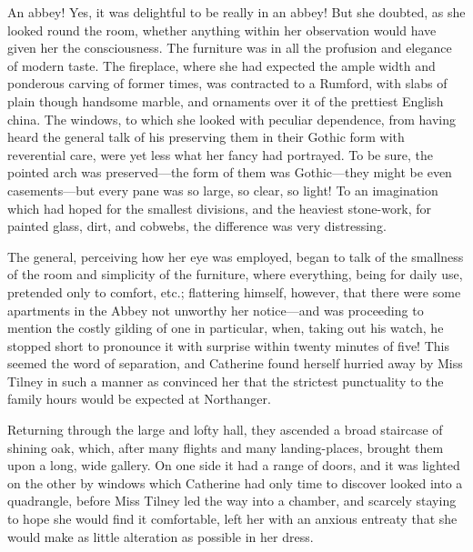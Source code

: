  An abbey! Yes, it was delightful to be really in an abbey! But she doubted, as she looked round the room, whether anything within her observation would have given her the consciousness. The furniture was in all the profusion and elegance of modern taste. The fireplace, where she had expected the ample width and ponderous carving of former times, was contracted to a Rumford, with slabs of plain though handsome marble, and ornaments over it of the prettiest English china. The windows, to which she looked with peculiar dependence, from having heard the general talk of his preserving them in their Gothic form with reverential care, were yet less what her fancy had portrayed. To be sure, the pointed arch was preserved—the form of them was Gothic—they might be even casements—but every pane was so large, so clear, so light! To an imagination which had hoped for the smallest divisions, and the heaviest stone-work, for painted glass, dirt, and cobwebs, the difference was very distressing. 

 The general, perceiving how her eye was employed, began to talk of the smallness of the room and simplicity of the furniture, where everything, being for daily use, pretended only to comfort, etc.; flattering himself, however, that there were some apartments in the Abbey not unworthy her notice—and was proceeding to mention the costly gilding of one in particular, when, taking out his watch, he stopped short to pronounce it with surprise within twenty minutes of five! This seemed the word of separation, and Catherine found herself hurried away by Miss Tilney in such a manner as convinced her that the strictest punctuality to the family hours would be expected at Northanger. 

 Returning through the large and lofty hall, they ascended a broad staircase of shining oak, which, after many flights and many landing-places, brought them upon a long, wide gallery. On one side it had a range of doors, and it was lighted on the other by windows which Catherine had only time to discover looked into a quadrangle, before Miss Tilney led the way into a chamber, and scarcely staying to hope she would find it comfortable, left her with an anxious entreaty that she would make as little alteration as possible in her dress. 